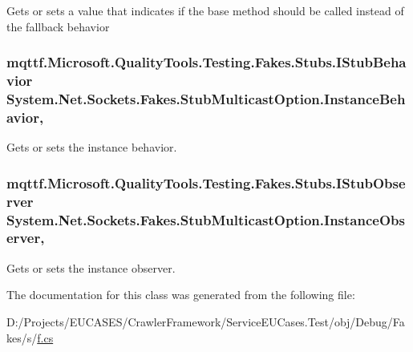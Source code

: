 Gets or sets a value that indicates if the base method should be called instead of the fallback behavior

\hypertarget{class_system_1_1_net_1_1_sockets_1_1_fakes_1_1_stub_multicast_option_a41f4ba56c4be80d2ff99d3b31a37048d}{
\subsubsection[{Instance\-Behavior}]{\setlength{\rightskip}{0pt plus 5cm}mqttf.\-Microsoft.\-Quality\-Tools.\-Testing.\-Fakes.\-Stubs.\-I\-Stub\-Behavior System.\-Net.\-Sockets.\-Fakes.\-Stub\-Multicast\-Option.\-Instance\-Behavior\hspace{0.3cm}{\ttfamily [get]}, {\ttfamily [set]}}}\label{class_system_1_1_net_1_1_sockets_1_1_fakes_1_1_stub_multicast_option_a41f4ba56c4be80d2ff99d3b31a37048d}


Gets or sets the instance behavior.

\hypertarget{class_system_1_1_net_1_1_sockets_1_1_fakes_1_1_stub_multicast_option_aacb48ce48acdff89276bf289ea60b532}{
\subsubsection[{Instance\-Observer}]{\setlength{\rightskip}{0pt plus 5cm}mqttf.\-Microsoft.\-Quality\-Tools.\-Testing.\-Fakes.\-Stubs.\-I\-Stub\-Observer System.\-Net.\-Sockets.\-Fakes.\-Stub\-Multicast\-Option.\-Instance\-Observer\hspace{0.3cm}{\ttfamily [get]}, {\ttfamily [set]}}}\label{class_system_1_1_net_1_1_sockets_1_1_fakes_1_1_stub_multicast_option_aacb48ce48acdff89276bf289ea60b532}


Gets or sets the instance observer.



The documentation for this class was generated from the following file\-:\begin{DoxyCompactItemize}
\item 
D\-:/\-Projects/\-E\-U\-C\-A\-S\-E\-S/\-Crawler\-Framework/\-Service\-E\-U\-Cases.\-Test/obj/\-Debug/\-Fakes/s/\hyperlink{s_2f_8cs}{f.\-cs}\end{DoxyCompactItemize}
